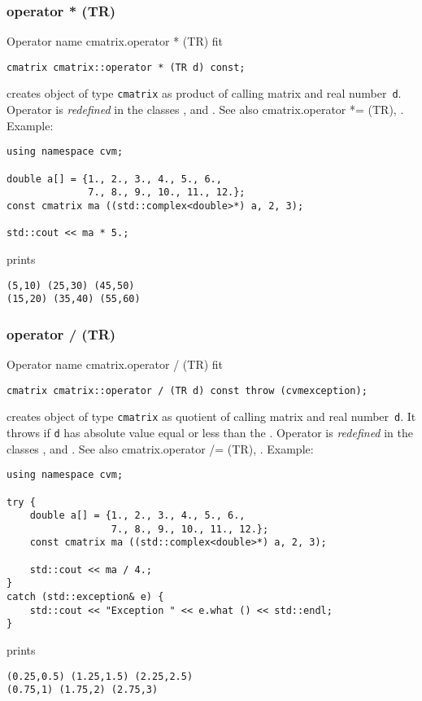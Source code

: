 \subsubsection{operator * (TR)}
Operator%
\pdfdest name {cmatrix.operator * (TR)} fit
\begin{verbatim}
cmatrix cmatrix::operator * (TR d) const;
\end{verbatim}
creates  object of type \verb"cmatrix" as  product of
 calling matrix and  real number~\verb"d".
Operator is \emph{redefined} in the classes
,  
and .
See also 
{cmatrix.operator *= (TR)},
.
Example:
\begin{Verbatim}
using namespace cvm;

double a[] = {1., 2., 3., 4., 5., 6.,
              7., 8., 9., 10., 11., 12.};
const cmatrix ma ((std::complex<double>*) a, 2, 3);

std::cout << ma * 5.;
\end{Verbatim}
prints
\begin{Verbatim}
(5,10) (25,30) (45,50)
(15,20) (35,40) (55,60)
\end{Verbatim}
\newpage



\subsubsection{operator / (TR)}
Operator%
\pdfdest name {cmatrix.operator / (TR)} fit
\begin{verbatim}
cmatrix cmatrix::operator / (TR d) const throw (cvmexception);
\end{verbatim}
creates  object of type \verb"cmatrix" as  quotient of
 calling matrix and  real number~\verb"d". It throws
if \verb"d" has  absolute value equal or less than the
.
Operator is \emph{redefined} in the classes
,  
and .
See also 
{cmatrix.operator /= (TR)},
.
Example:
\begin{Verbatim}
using namespace cvm;

try {
    double a[] = {1., 2., 3., 4., 5., 6.,
                  7., 8., 9., 10., 11., 12.};
    const cmatrix ma ((std::complex<double>*) a, 2, 3);

    std::cout << ma / 4.;
}
catch (std::exception& e) {
    std::cout << "Exception " << e.what () << std::endl;
}
\end{Verbatim}
prints
\begin{Verbatim}
(0.25,0.5) (1.25,1.5) (2.25,2.5)
(0.75,1) (1.75,2) (2.75,3)
\end{Verbatim}
\newpage



